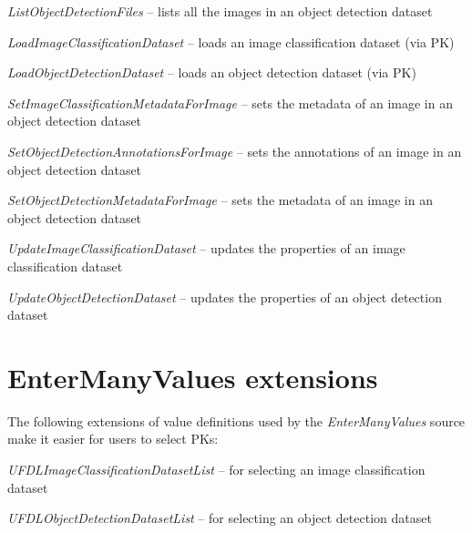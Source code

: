 \documentclass[a4paper]{book}
\begin{document}
\begin{tight_itemize}
  \item \textit{ListObjectDetectionFiles} -- lists all the images in an object detection dataset
  \item \textit{LoadImageClassificationDataset} -- loads an image classification dataset (via PK)
  \item \textit{LoadObjectDetectionDataset} -- loads an object detection dataset (via PK)
  \item \textit{SetImageClassificationMetadataForImage} -- sets the metadata of an image in an object detection dataset
  \item \textit{SetObjectDetectionAnnotationsForImage} -- sets the annotations of an image in an object detection dataset
  \item \textit{SetObjectDetectionMetadataForImage} -- sets the metadata of an image in an object detection dataset
  \item \textit{UpdateImageClassificationDataset} -- updates the properties of an image classification dataset
  \item \textit{UpdateObjectDetectionDataset} -- updates the properties of an object detection dataset
\end{tight_itemize}

\section{EnterManyValues extensions}
The following extensions of value definitions used by the \textit{EnterManyValues}
source make it easier for users to select PKs:
\begin{tight_itemize}
  \item \textit{UFDLImageClassificationDatasetList} -- for selecting an image classification dataset
  \item \textit{UFDLObjectDetectionDatasetList} -- for selecting an object detection dataset
\end{tight_itemize}


\end{document}
